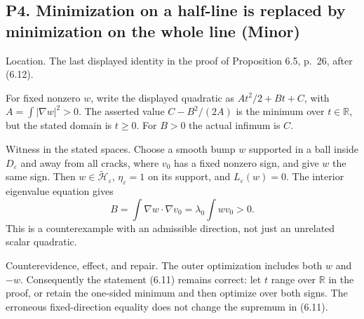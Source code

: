 \documentclass[10pt]{article}
\begin{document}
\subsection*{P4. Minimization on a half-line is replaced by minimization on the whole line (Minor)}
Location. The last displayed identity in the proof of Proposition 6.5, p. 26, after (6.12).\par
For fixed nonzero \(w\), write the displayed quadratic as \(At^2/2+Bt+C\), with \(A=\int|\nabla w|^2>0\). The asserted value \(C-B^2/(2A)\) is the minimum over \(t\in\mathbb R\), but the stated domain is \(t\ge0\). For \(B>0\) the actual infimum is \(C\).\par
Witness in the stated spaces. Choose a smooth bump \(w\) supported in a ball inside \(D_\varepsilon\) and away from all cracks, where \(v_0\) has a fixed nonzero sign, and give \(w\) the same sign. Then \(w\in\widetilde{\mathcal H}_\varepsilon\), \(\eta_\varepsilon=1\) on its support, and \(L_\varepsilon(w)=0\). The interior eigenvalue equation gives \[B=\int\nabla w\cdot\nabla v_0
       =\lambda_0\int wv_0>0 .\] This is a counterexample with an admissible direction, not just an unrelated scalar quadratic.\par
Counterevidence, effect, and repair. The outer optimization includes both \(w\) and \(-w\). Consequently the statement (6.11) remains correct: let \(t\) range over \(\mathbb R\) in the proof, or retain the one-sided minimum and then optimize over both signs. The erroneous fixed-direction equality does not change the supremum in (6.11).\par
\end{document}
